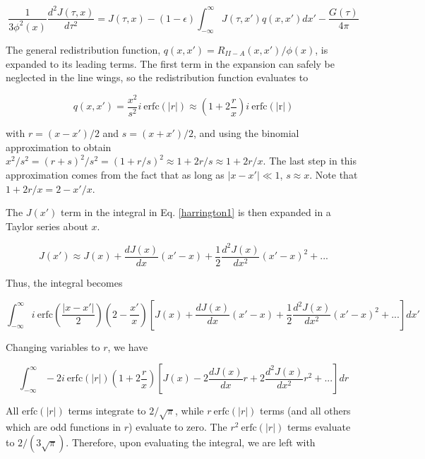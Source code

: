 \documentclass[onecolumn]{aastex63}
\begin{document}
\begin{equation} \label{harrington1}
    \frac{1}{3\phi^2(x)}\frac{d^2J(\tau, x)}{d\tau^2} = J(\tau, x) - (1-\epsilon)\int_{-\infty}^{\infty}J(\tau, x')q(x, x')dx' - \frac{G(\tau)}{4\pi}
\end{equation}

The general redistribution function, $q(x, x') = R_{II-A}(x, x')/\phi (x)$, is expanded to its leading terms. The first term in the expansion can safely be neglected in the line wings, so the redistribution function evaluates to 

\begin{equation}
    q(x, x') = \frac{x^2}{s^2}i\  \mathrm{erfc}(|r|) \approx \left(1+2\frac{r}{x}\right)i\ \mathrm{erfc(|r|)}
\end{equation}

with $r=(x-x')/2$ and $s=(x+x')/2$, and using the binomial approximation to obtain $x^2/s^2 = (r+s)^2/s^2 = (1+r/s)^2 \approx 1 + 2r/s \approx 1 + 2r/x$. The last step in this approximation comes from the fact that as long as $|x-x'|\ll 1$, $s \approx x$. Note that $1 + 2r/x = 2 - x'/x$.

The $J(x')$ term in the integral in Eq. \ref{harrington1} is then expanded in a Taylor series about $x$.

\begin{equation}
    J(x') \approx J(x) + \frac{dJ(x)}{dx}(x' - x) + \frac{1}{2}\frac{d^2J(x)}{dx^2}(x'-x)^2 + ...
\end{equation}

Thus, the integral becomes

\begin{equation}
    \int_{-\infty}^{\infty}i\ \mathrm{erfc}\left(\frac{|x-x'|}{2}\right)\left(2-\frac{x'}{x}\right)\left[J(x) + \frac{dJ(x)}{dx}(x' - x) + \frac{1}{2}\frac{d^2J(x)}{dx^2}(x'-x)^2 + ...\right] dx'
\end{equation}

Changing variables to $r$, we have

\begin{equation}
    \int_{-\infty}^{\infty}-2i\ \mathrm{erfc}\left(|r|\right)\left(1+2\frac{r}{x}\right)\left[J(x) - 2\frac{dJ(x)}{dx}r + 2\frac{d^2J(x)}{dx^2}r^2 + ...\right] dr
\end{equation}

All $\mathrm{erfc}(|r|)$ terms integrate to $2/\sqrt{\pi}$, while $r\ \mathrm{erfc}(|r|)$ terms (and all others which are odd functions in $r$) evaluate to zero. The $r^2\ \mathrm{erfc}(|r|)$ terms evaluate to $2/(3\sqrt{\pi})$. Therefore, upon evaluating the integral, we are left with
\end{document}
